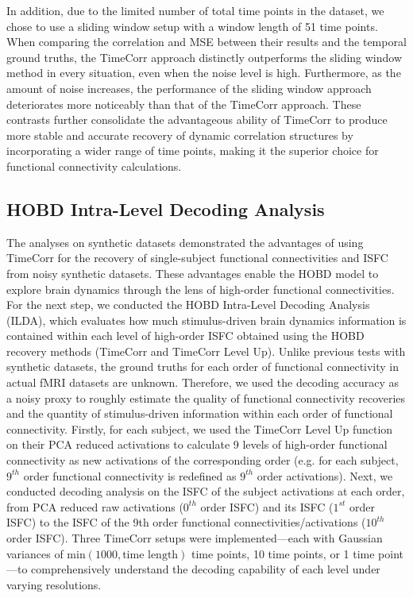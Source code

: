 \documentclass[11pt]{article}
\begin{document}
In addition, due to the limited number of total time points in the dataset, we chose to use a sliding window setup with a window length of 51 time points. When comparing the correlation and MSE between their results and the temporal ground truths, the TimeCorr approach distinctly outperforms the sliding window method in every situation, even when the noise level is high. Furthermore, as the amount of noise increases, the performance of the sliding window approach deteriorates more noticeably than that of the TimeCorr approach. These contrasts further consolidate the advantageous ability of TimeCorr to produce more stable and accurate recovery of dynamic correlation structures by incorporating a wider range of time points, making it the superior choice for functional connectivity calculations.

\clearpage
\newpage
\subsection{HOBD Intra-Level Decoding Analysis}
The analyses on synthetic datasets demonstrated the advantages of using TimeCorr for the recovery of single-subject functional connectivities and ISFC from noisy synthetic datasets. These advantages enable the HOBD model to explore brain dynamics through the lens of high-order functional connectivities. For the next step, we conducted the HOBD Intra-Level Decoding Analysis (ILDA), which evaluates how much stimulus-driven brain dynamics information is contained within each level of high-order ISFC obtained using the HOBD recovery methods (TimeCorr and TimeCorr Level Up). Unlike previous tests with synthetic datasets, the ground truths for each order of functional connectivity in actual fMRI datasets are unknown. Therefore, we used the decoding accuracy as a noisy proxy to roughly estimate the quality of functional connectivity recoveries and the quantity of stimulus-driven information within each order of functional connectivity. Firstly, for each subject, we used the TimeCorr Level Up function on their PCA reduced activations to calculate 9 levels of high-order functional connectivity as new activations of the corresponding order (e.g. for each subject, $9^{th}$ order functional connectivity is redefined as $9^{th}$ order activations). Next, we conducted decoding analysis on the ISFC of the subject activations at each order, from PCA reduced raw activations ($0^{th}$ order ISFC) and its ISFC ($1^{st}$ order ISFC) to the ISFC of the 9th order functional connectivities/activations ($10^{th}$ order ISFC). Three TimeCorr setups were implemented---each with Gaussian variances of $\text{min}(1000,\text{time length})$ time points, 10 time points, or 1 time point---to comprehensively understand the decoding capability of each level under varying resolutions.
\end{document}
